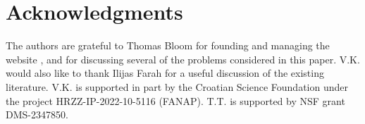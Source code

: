 \documentclass[11pt,letterpaper,reqno]{amsart}
\numberwithin{equation}{section}
\theoremstyle{definition}
\numberwithin{equation}{section}
\begin{document}
\section*{Acknowledgments}
The authors are grateful to Thomas Bloom for founding and managing the website \cite{EP}, and for discussing several of the problems considered in this paper.
V.K. would also like to thank Ilijas Farah for a useful discussion of the existing literature.
V.K. is supported in part by the Croatian Science Foundation under the project HRZZ-IP-2022-10-5116 (FANAP). T.T. is supported by NSF grant DMS-2347850.





\end{document}
